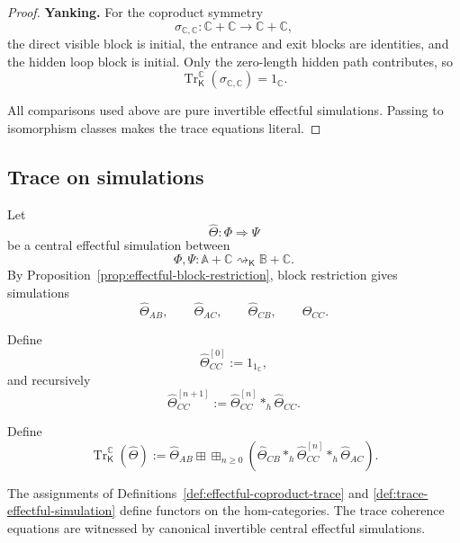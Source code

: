 \begin{proof}
\textbf{Yanking.}
For the coproduct symmetry
\[
    \sigma_{\mathbb C,\mathbb C}:
    \mathbb C+\mathbb C
    \longrightarrow
    \mathbb C+\mathbb C,
\]
the direct visible block is initial, the entrance and exit blocks are
identities, and the hidden loop block is initial.  Only the zero-length
hidden path contributes, so
\[
    \operatorname{Tr}^{\mathbb C}_{\mathsf K}
    (\sigma_{\mathbb C,\mathbb C})
    =
    1_{\mathbb C}.
\]

All comparisons used above are pure invertible effectful simulations.
Passing to isomorphism classes makes the trace equations literal.
\end{proof}

\subsection{Trace on simulations}
\label{subsec:effectful-trace-simulations-uniformity}

Let
\[
    \widehat\Theta:
    \Phi\Rightarrow\Psi
\]
be a central effectful simulation between
\[
    \Phi,\Psi:
    \mathbb A+\mathbb C
    \rightsquigarrow_{\mathsf K}
    \mathbb B+\mathbb C.
\]
By Proposition~\ref{prop:effectful-block-restriction}, block restriction gives
simulations
\[
    \widehat\Theta_{AB},
    \qquad
    \widehat\Theta_{AC},
    \qquad
    \widehat\Theta_{CB},
    \qquad
    \widehat\Theta_{CC}.
\]

Define
\[
    \widehat\Theta_{CC}^{[0]}
    :=
    1_{1_{\mathbb C}},
\]
and recursively
\[
    \widehat\Theta_{CC}^{[n+1]}
    :=
    \widehat\Theta_{CC}^{[n]}
    \ast_h
    \widehat\Theta_{CC}.
\]

\begin{definition}
\label{def:trace-effectful-simulation}
Define
\[
    \operatorname{Tr}^{\mathbb C}_{\mathsf K}
    (\widehat\Theta)
    :=
    \widehat\Theta_{AB}
    \boxplus
    \boxplus_{n\geq0}
    \left(
        \widehat\Theta_{CB}
        \ast_h
        \widehat\Theta_{CC}^{[n]}
        \ast_h
        \widehat\Theta_{AC}
    \right).
\]
\end{definition}

\begin{theorem}
\label{thm:hom-category-effectful-trace}
The assignments of
Definitions~\ref{def:effectful-coproduct-trace} and
\ref{def:trace-effectful-simulation} define functors on the hom-categories.
The trace coherence equations are witnessed by canonical invertible central
effectful simulations.
\end{theorem}

